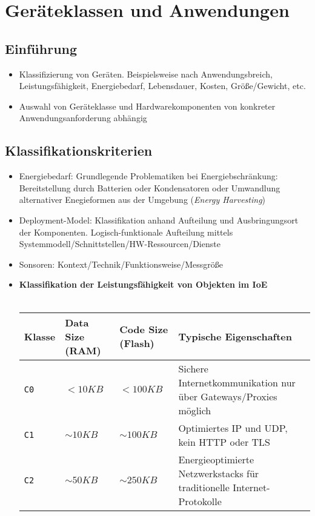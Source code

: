 \section{Geräteklassen und Anwendungen}

\subsection{Einführung}
\begin{itemize}
	\item Klassifizierung von Geräten. Beispielsweise nach Anwendungsbreich, Leistungsfähigkeit, Energiebedarf, Lebensdauer, Kosten, Größe/Gewicht, etc.
	\item Auswahl von Geräteklasse und Hardwarekomponenten von konkreter Anwendungsanforderung abhängig
\end{itemize}


\subsection{Klassifikationskriterien}
\begin{itemize}
	\item Energiebedarf: Grundlegende Problematiken bei Energiebschränkung: Bereitstellung durch Batterien oder Kondensatoren oder Umwandlung alternativer Enegieformen aus der Umgebung (\textit{Energy Harvesting})
	\item Deployment-Model: Klassifikation anhand Aufteilung und Ausbringungsort der Komponenten. Logisch-funktionale Aufteilung mittels Systemmodell/Schnittstellen/HW-Ressourcen/Dienste
	\item Sonsoren: Kontext/Technik/Funktionsweise/Messgröße
	\item \textbf{Klassifikation der Leistungsfähigkeit von Objekten im IoE}\\\\
	\begin{tabularx}{\linewidth}{l|l|l|X}
		\textbf{Klasse} & \textbf{Data Size (RAM)} & \textbf{Code Size (Flash)} & \textbf{Typische Eigenschaften} \\
		\hline
		\texttt{C0} & \(< 10 KB\) & \(< 100 KB\) & Sichere Internetkommunikation nur über Gateways/Proxies möglich \\
		\hline
		\texttt{C1} & \(\sim 10 KB\) & \(\sim 100 KB\) & Optimiertes IP und UDP, kein HTTP oder TLS \\
		\hline
		\texttt{C2} & \(\sim 50 KB\) & \(\sim 250 KB\) & Energieoptimierte Netzwerkstacks für traditionelle Internet-Protokolle \\
	\end{tabularx}
\end{itemize}


